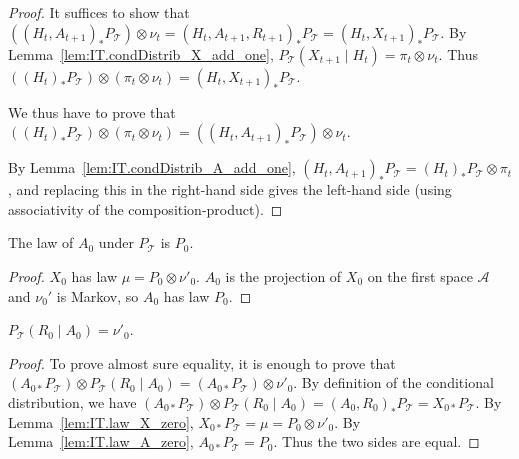 \begin{proof}\leanok
It suffices to show that $((H_t, A_{t+1})_* P_{\mathcal{T}}) \otimes \nu_t = (H_t, A_{t+1}, R_{t+1})_* P_{\mathcal{T}} = (H_t, X_{t+1})_* P_{\mathcal{T}}$.
By Lemma~\ref{lem:IT.condDistrib_X_add_one}, $P_{\mathcal{T}}\left(X_{t+1} \mid H_t\right) = \pi_t \otimes \nu_t$.
Thus $((H_t)_* P_{\mathcal{T}}) \otimes (\pi_t \otimes \nu_t) = (H_t, X_{t+1})_* P_{\mathcal{T}}$.

We thus have to prove that $((H_t)_* P_{\mathcal{T}}) \otimes (\pi_t \otimes \nu_t) = ((H_t, A_{t+1})_* P_{\mathcal{T}}) \otimes \nu_t$.

By Lemma~\ref{lem:IT.condDistrib_A_add_one}, $(H_t, A_{t+1})_* P_{\mathcal{T}} = (H_t)_* P_{\mathcal{T}} \otimes \pi_t$, and replacing this in the right-hand side gives the left-hand side (using associativity of the composition-product).
\end{proof}


\begin{lemma}\label{lem:IT.law_A_zero}
  \leanok
The law of $A_0$ under $P_{\mathcal{T}}$ is $P_0$.
\end{lemma}

\begin{proof}\leanok
$X_0$ has law $\mu = P_0 \otimes \nu'_0$. $A_0$ is the projection of $X_0$ on the first space $\mathcal{A}$ and $\nu_0'$ is Markov, so $A_0$ has law $P_0$.
\end{proof}


\begin{lemma}\label{lem:IT.condDistrib_R_zero}
  \leanok
$P_{\mathcal{T}}\left(R_0 \mid A_0\right) = \nu'_0$.
\end{lemma}

\begin{proof}\leanok
To prove almost sure equality, it is enough to prove that $(A_{0*} P_{\mathcal{T}}) \otimes P_{\mathcal{T}}\left(R_0 \mid A_0\right) = (A_{0*} P_{\mathcal{T}}) \otimes \nu'_0$.
By definition of the conditional distribution, we have $(A_{0*} P_{\mathcal{T}}) \otimes P_{\mathcal{T}}\left(R_0 \mid A_0\right) = (A_0, R_0)_* P_{\mathcal{T}} = X_{0*} P_{\mathcal{T}}$.
By Lemma~\ref{lem:IT.law_X_zero}, $X_{0*} P_{\mathcal{T}} = \mu = P_0 \otimes \nu'_0$.
By Lemma~\ref{lem:IT.law_A_zero}, $A_{0*} P_{\mathcal{T}} = P_0$.
Thus the two sides are equal.
\end{proof}


